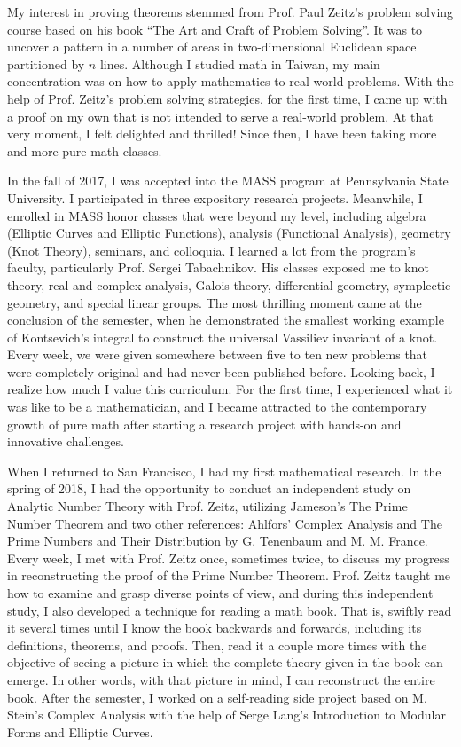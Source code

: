 \documentclass[10pt]{amsart}
\begin{document}
My interest in proving theorems stemmed from Prof. Paul Zeitz's problem solving course based on his book ``The Art and Craft of Problem Solving''. It was to uncover a pattern in a number of areas in two-dimensional Euclidean space partitioned by $n$ lines. Although I studied math in Taiwan, my main concentration was on how to apply mathematics to real-world problems. With the help of Prof. Zeitz's problem solving strategies, for the first time, I came up with a proof on my own that is not intended to serve a real-world problem. At that very moment, I felt delighted and thrilled! Since then, I have been taking more and more pure math classes.


In the fall of 2017, I was accepted into the MASS program at Pennsylvania State University. I participated in three expository research projects. Meanwhile, I enrolled in MASS honor classes that were beyond my level, including algebra (Elliptic Curves and Elliptic Functions), analysis (Functional Analysis), geometry (Knot Theory), seminars, and colloquia. I learned a lot from the program's faculty, particularly Prof. Sergei Tabachnikov. His classes exposed me to knot theory, real and complex analysis, Galois theory, differential geometry, symplectic geometry, and special linear groups. The most thrilling moment came at the conclusion of the semester, when he demonstrated the smallest working example of Kontsevich’s integral to construct the universal Vassiliev invariant of a knot. Every week, we were given somewhere between five to ten new problems that were completely original and had never been published before. Looking back, I realize how much I value this curriculum. For the first time, I experienced what it was like to be a mathematician, and I became attracted to the contemporary growth of pure math after starting a research project with hands-on and innovative challenges.


When I returned to San Francisco, I had my first mathematical research. In the spring of 2018, I had the opportunity to conduct an independent study on Analytic Number Theory with Prof. Zeitz, utilizing Jameson's The Prime Number Theorem and two other references: Ahlfors' Complex Analysis and The Prime Numbers and Their Distribution by G. Tenenbaum and M. M. France. Every week, I met with Prof. Zeitz once, sometimes twice, to discuss my progress in reconstructing the proof of the Prime Number Theorem. Prof. Zeitz taught me how to examine and grasp diverse points of view, and during this independent study, I also developed a technique for reading a math book. That is, swiftly read it several times until I know the book backwards and forwards, including its definitions, theorems, and proofs. Then, read it a couple more times with the objective of seeing a picture in which the complete theory given in the book can emerge. In other words, with that picture in mind, I can reconstruct the entire book. After the semester, I worked on a self-reading side project based on M. Stein's Complex Analysis with the help of Serge Lang's Introduction to Modular Forms and Elliptic Curves.
\end{document}
